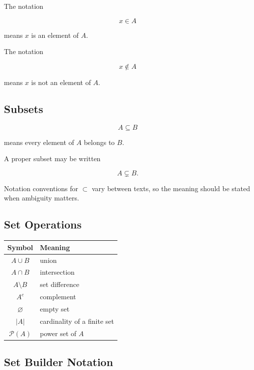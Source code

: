 The notation

\[
\boxed{
x\in A
}
\]

means \(x\) is an element of \(A\).

The notation

\[
\boxed{
x\notin A
}
\]

means \(x\) is not an element of \(A\).

\subsection{Subsets}
\label{subsec:subset-symbols}

\[
\boxed{
A\subseteq B
}
\]

means every element of \(A\) belongs to \(B\).

A proper subset may be written

\[
\boxed{
A\subsetneq B.
}
\]

Notation conventions for \(\subset\) vary between texts, so the meaning
should be stated when ambiguity matters.

\subsection{Set Operations}
\label{subsec:set-operation-symbols}

\begin{center}
\begin{tabular}{c|l}
\textbf{Symbol} & \textbf{Meaning} \\ \hline
\( A\cup B \) & union \\
\( A\cap B \) & intersection \\
\( A\setminus B \) & set difference \\
\( A^c \) & complement \\
\( \varnothing \) & empty set \\
\( |A| \) & cardinality of a finite set \\
\( \mathcal{P}(A) \) & power set of \(A\)
\end{tabular}
\end{center}

\subsection{Set Builder Notation}
\label{subsec:set-builder-notation}

